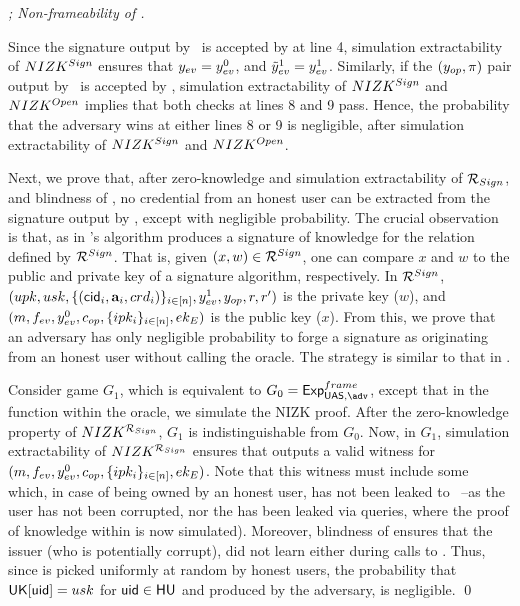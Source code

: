 \begin{proof}[; Non-frameability of \CUASGen]
  \label{prf:frame-uas}


  Since the signature output by \adv~is accepted by \Verify at line 4,
  simulation extractability of $NIZK^{Sign}$ ensures that $y_{ev} = y_{ev}^0$,
  and $\tilde{y}_{ev}^1 = y_{ev}^1$. Similarly, if the $(y_{op},\pi)$
  pair output by \adv~is accepted by \Judge, simulation extractability of
  $NIZK^{Sign}$ and $NIZK^{Open}$ implies that both checks at lines 8 and 9
  pass. Hence, the probability that the adversary wins at either lines 8 or 9 is
  negligible, after simulation extractability of $NIZK^{Sign}$ and
  $NIZK^{Open}$.

  Next, we prove that, after zero-knowledge and simulation extractability of
  $\mathcal{R}_{Sign}$, and blindness of \SBCM, no credential from an honest user
  can be extracted from the signature output by \adv, except with negligible
  probability.
  The crucial observation is that, as in \cite{cl06} \CUASGen's \Sign algorithm
  produces a signature of knowledge for the relation defined by
  $\mathcal{R}^{Sign}$. That is, given $(x,w) \in \mathcal{R}^{Sign}$, one can
  compare $x$ and $w$ to the public and private key of a signature algorithm,
  respectively. In $\mathcal{R}^{Sign}$, $(upk,usk,\lbrace (\mathsf{cid}_i,\mathbf{a}_i,
  crd_i)\rbrace_{i\in[n]},y_{ev}^1,y_{op},r,r')$ is the private key ($w$), and
  $(m,f_{ev},y_{ev}^0,c_{op},\lbrace ipk_i \rbrace_{i\in[n]},ek_{E})$ is the
  public key ($x$).
  From this, we prove that an adversary has only negligible probability to forge
  a signature as originating from an honest user without calling the \SIGN
  oracle. The strategy is similar to that in \cite[Theorem 2.1]{cl06}.

  Consider game $G_1$, which is equivalent to $G_0 = \ExpNonframe$, except that
  in the \Sign function within the \SIGN oracle, we simulate the NIZK proof.
  After the zero-knowledge property of $NIZK^{\mathcal{R}_{Sign}}$, $G_1$ is
  indistinguishable from $G_0$. Now, in $G_1$, simulation extractability of
  $NIZK^{\mathcal{R}_{Sign}}$ ensures that \ExtractSign outputs a valid
  witness for $(m,f_{ev},y_{ev}^0,c_{op},\lbrace ipk_i \rbrace_{i\in[n]},
  ek_{E})$. Note that this witness must include some \usk which, in case of
  being owned by an honest user, has not been leaked to \adv~--as the user
  has not been corrupted, nor the \usk has been leaked via \SIGN queries,
  where the proof of knowledge within \Sign is now simulated). Moreover,
  blindness of \SBCM ensures that the issuer (who is potentially corrupt), did
  not learn \usk either during calls to \OBTAIN. Thus, since \usk is picked
  uniformly at random by honest users, the probability that $\mathsf{UK}[\mathsf{uid}] = usk$
  for $\mathsf{uid} \in \mathsf{HU}$ and \Sig produced by the adversary, is negligible.
  \qed
\end{proof}

